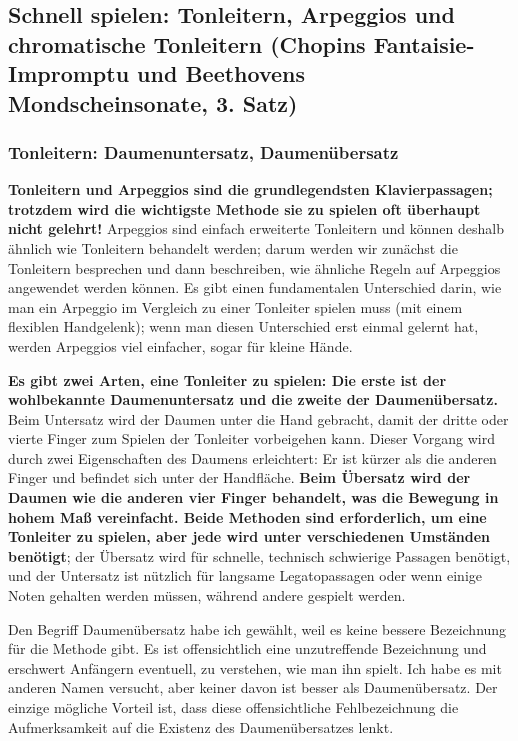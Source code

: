 
\subsection{Schnell spielen: Tonleitern, Arpeggios und chromatische Tonleitern (Chopins Fantaisie-Impromptu und Beethovens Mondscheinsonate, 3. Satz)}
\label{c1iii5}

\subsubsection{Tonleitern: Daumenuntersatz, Daumenübersatz}
\label{c1iii5a}

\textbf{Tonleitern und Arpeggios sind die grundlegendsten Klavierpassagen; trotzdem wird die wichtigste Methode sie zu spielen oft überhaupt nicht gelehrt!}
Arpeggios sind einfach erweiterte Tonleitern und können deshalb ähnlich wie Tonleitern behandelt werden; darum werden wir zunächst die Tonleitern besprechen und dann beschreiben, wie ähnliche Regeln auf Arpeggios angewendet werden können.
Es gibt einen fundamentalen Unterschied darin, wie man ein Arpeggio im Vergleich zu einer Tonleiter spielen muss (mit einem flexiblen Handgelenk); wenn man diesen Unterschied erst einmal gelernt hat, werden Arpeggios viel einfacher, sogar für kleine Hände.

\textbf{Es gibt zwei Arten, eine Tonleiter zu spielen: Die erste ist der wohlbekannte Daumenuntersatz und die zweite der Daumenübersatz.}
Beim Untersatz wird der Daumen unter die Hand gebracht, damit der dritte oder vierte Finger zum Spielen der Tonleiter vorbeigehen kann.
Dieser Vorgang wird durch zwei Eigenschaften des Daumens erleichtert: Er ist kürzer als die anderen Finger und befindet sich unter der Handfläche.
\textbf{Beim Übersatz wird der Daumen wie die anderen vier Finger behandelt, was die Bewegung in hohem Maß vereinfacht.
Beide Methoden sind erforderlich, um eine Tonleiter zu spielen, aber jede wird unter verschiedenen Umständen benötigt}; der Übersatz wird für schnelle, technisch schwierige Passagen benötigt, und der Untersatz ist nützlich für langsame Legatopassagen oder wenn einige Noten gehalten werden müssen, während andere gespielt werden.

Den Begriff Daumenübersatz habe ich gewählt, weil es keine bessere Bezeichnung für die Methode gibt.
Es ist offensichtlich eine unzutreffende Bezeichnung und erschwert Anfängern eventuell, zu verstehen, wie man ihn spielt.
Ich habe es mit anderen Namen versucht, aber keiner davon ist besser als Daumenübersatz.
Der einzige mögliche Vorteil ist, dass diese offensichtliche Fehlbezeichnung die Aufmerksamkeit auf die Existenz des Daumenübersatzes lenkt.

